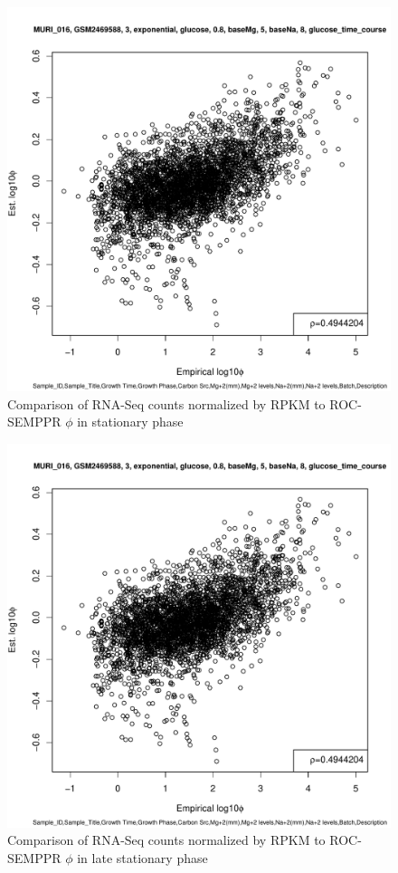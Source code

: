 \documentclass[11pt]{labbook}
\begin{document}
\begin{figure}[H]
\centering
\includegraphics[page=7,scale=0.6]{Ecoli_REL606/GSE94117_rpkm.pdf}
\caption{Comparison of RNA-Seq counts normalized by RPKM to ROC-SEMPPR $\phi$ in stationary phase}
\end{figure}

\begin{figure}[H]
\centering
\includegraphics[page=9,scale=0.6]{Ecoli_REL606/GSE94117_rpkm.pdf}
\caption{Comparison of RNA-Seq counts normalized by RPKM to ROC-SEMPPR $\phi$ in late stationary phase}
\end{figure}
\end{document}
